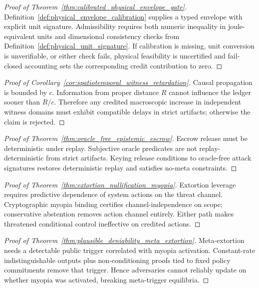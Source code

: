 \documentclass[11pt]{article}
\theoremstyle{definition}
\theoremstyle{plain}
\newcommand{\clight}{c}
\begin{document}
\begin{proof}[Proof of Theorem~\ref{thm:calibrated_physical_envelope_gate}]
Definition~\ref{def:physical_envelope_calibration} supplies a typed envelope with explicit unit signature.
Admissibility requires both numeric inequality in joule-equivalent units and dimensional consistency checks from Definition~\ref{def:physical_unit_signature}.
If calibration is missing, unit conversion is unverifiable, or either check fails, physical feasibility is uncertified and fail-closed accounting sets the corresponding credit contribution to zero.
\end{proof}

\begin{proof}[Proof of Corollary~\ref{cor:spatiotemporal_witness_retardation}]
Causal propagation is bounded by $\clight$.
Information from proper distance $R$ cannot influence the ledger sooner than $R/\clight$.
Therefore any credited macroscopic increase in independent witness domains must exhibit compatible delays in strict artifacts; otherwise the claim is rejected.
\end{proof}

\begin{proof}[Proof of Theorem~\ref{thm:oracle_free_epistemic_escrow}]
Escrow release must be deterministic under replay.
Subjective oracle predicates are not replay-deterministic from strict artifacts.
Keying release conditions to oracle-free attack signatures restores deterministic replay and satisfies no-meta constraints.
\end{proof}

\begin{proof}[Proof of Theorem~\ref{thm:extortion_nullification_myopia}]
Extortion leverage requires predictive dependence of system actions on the threat channel.
Cryptographic myopia binding certifies channel-independence on scope; conservative abstention removes action channel entirely.
Either path makes threatened conditional control ineffective on credited actions.
\end{proof}

\begin{proof}[Proof of Theorem~\ref{thm:plausible_deniability_meta_extortion}]
Meta-extortion needs a detectable public trigger correlated with myopia activation.
Constant-rate indistinguishable outputs plus non-conditioning proofs tied to fixed policy commitments remove that trigger.
Hence adversaries cannot reliably update on whether myopia was activated, breaking meta-trigger equilibria.
\end{proof}
\end{document}
